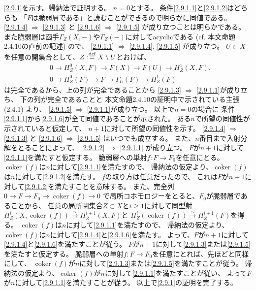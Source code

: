 \documentclass[uplatex,dvipdfmx]{jsarticle}
\makeatletter
\theoremstyle{definition}
\renewenvironment{proof}[1][\proofname]{
  \pushQED{\qed}%
  \normalfont \topsep6\p@\@plus6\p@\relax
  \trivlist
  \item[\hskip\labelsep
    #1\@addpunct{\textbf{.}}]\ignorespaces
}{%
  \popQED\endtrivlist\@endpefalse
}
\providecommand{\proofname}{証明}
\DeclareMathOperator{\coker}{\mathrm{coker}}
\def\dfn{:\overset{\mbox{{\scriptsize def}}}{=}}
\makeatother
\begin{document}
\begin{proof}
  \ref{2.9.1}を示す。帰納法で証明する。
  \(n=0\)とする。
  条件\ref{2.9.1.1}と\ref{2.9.1.2}はどちらも
  「\(F\)は脆弱層である」と読むことができるので明らかに同値である。
  \ref{2.9.1.4} \(\Rightarrow\) \ref{2.9.1.3} と
  \ref{2.9.1.6} \(\Rightarrow\) \ref{2.9.1.5} が成り立つことは明らかである。
  また脆弱層は函手\(\Gamma_Z(X,-)\)や\(\Gamma_Z(-)\)に対してacyclicである
  (cf. 本文命題2.4.10の直前の記述) ので、
  \ref{2.9.1.1} \(\Rightarrow\) \ref{2.9.1.4}, \ref{2.9.1.5} が成り立つ。
  \(U\subset X\)を任意の開集合として、\(Z\dfn X\setminus U\)とおけば、
  \begin{align*}
    &0 \to H^0_Z(X,F) \to F(X) \to F(U) \to H^1_Z(X,F), \\
    &0 \to H^0_Z(F) \to F \to \Gamma_U(F) \to H^1_Z(F)
  \end{align*}
  は完全であるから、上の列が完全であることから
  \ref{2.9.1.3} \(\Rightarrow\) \ref{2.9.1.1}が成り立ち、
  下の列が完全であることと
  本文命題2.4.10の証明中で示されている主張 (2.4.1) より、
  \ref{2.9.1.5} \(\Rightarrow\) \ref{2.9.1.1}が成り立つ。
  以上で\(n=0\)の場合に
  条件\ref{2.9.1.1}から\ref{2.9.1.6}が全て同値であることが示された。
  ある\(n\)で所望の同値性が示されていると仮定して、
  \(n+1\)に対して所望の同値性を示す。
  \ref{2.9.1.4} \(\Rightarrow\) \ref{2.9.1.3} と
  \ref{2.9.1.6} \(\Rightarrow\) \ref{2.9.1.5} はいつでも成立する。
  また、\(n\)番目まで入射分解をとることによって、
  \ref{2.9.1.2} \(\Rightarrow\) \ref{2.9.1.1} が成り立つ。
  \(F\)が\(n+1\)に対して\ref{2.9.1.1}を満たすと仮定する。
  脆弱層への単射\(f:F\to F_0\)を任意にとる。
  \(\coker(f)\)は\(n\)に対して\ref{2.9.1.1}を満たすので、
  帰納法の仮定より、\(\coker(f)\)は\(n\)に対して\ref{2.9.1.2}を満たす。
  \(f\)の取り方は任意だったので、
  これは\(F\)が\(n+1\)に対して\ref{2.9.1.2}を満たすことを意味する。
  また、完全列\(0\to F\to F_0\to \coker(f) \to 0\)
  で局所コホモロジーをとると、\(F_0\)が脆弱層であることから、
  任意の局所閉集合\(Z\subset X\)と\(i\geq 1\)に対して同型射
  \(H^i_Z(X,\coker(f)) \xrightarrow{\sim} H^{i+1}_Z(X,F)\)と
  \(H^i_Z(\coker(f)) \xrightarrow{\sim} H^{i+1}_Z(F)\)を得る。
  \(\coker(f)\)は\(n\)に対して\ref{2.9.1.1}を満たすので、
  帰納法の仮定より、\(\coker(f)\)は\(n\)に対して\ref{2.9.1.4}と\ref{2.9.1.6}を満たす。
  よって、\(F\)が\(n+1\)に対して\ref{2.9.1.4}と\ref{2.9.1.6}を満たすことが従う。
  \(F\)が\(n+1\)に対して\ref{2.9.1.3}または\ref{2.9.1.5}を満たすと仮定する。
  脆弱層への単射\(f:F\to F_0\)を任意にとれば、先ほどと同様にして、
  \(\coker(f)\)が\(n\)に対して\ref{2.9.1.3}または\ref{2.9.1.5}を満たすことが従う。
  帰納法の仮定より、\(\coker(f)\)が\(n\)に対して\ref{2.9.1.1}を満たすことが従い、
  よって\(F\)が\(n\)に対して\ref{2.9.1.1}を満たすことが従う。
  以上で\ref{2.9.1}の証明を完了する。


\end{proof}
\end{document}
